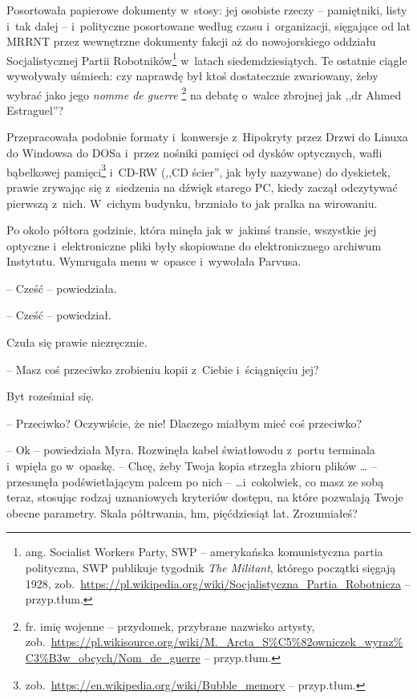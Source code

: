 \documentclass[oneside,polish,11pt,sfheadings]{mwbk}
\begin{document}
Posortowała papierowe dokumenty w~stosy: jej osobiste rzeczy -- pamiętniki, listy i~tak dalej -- i~polityczne posortowane według czasu i~organizacji, sięgające od lat MRRNT przez wewnętrzne dokumenty fakcji aż
do nowojorskiego oddziału Socjalistycznej Partii Robotników\footnote{ ang.
Socialist Workers Party, SWP -- amerykańska komunistyczna partia
polityczna, SWP publikuje tygodnik \textit{The Militant}, którego początki
sięgają 1928,
zob.~\url{https://pl.wikipedia.org/wiki/Socjalistyczna\_Partia\_Robotnicza}
-- przyp.tłum.} w~latach siedemdziesiątych. Te ostatnie ciągle
wywoływały uśmiech: czy naprawdę był ktoś dostatecznie zwariowany, żeby
wybrać jako jego \textit{nomme de guerre} \footnote{ fr. imię wojenne -- przydomek, przybrane nazwisko artysty,
zob.~\url{https://pl.wikisource.org/wiki/M.\_Arcta\_S\%C5\%82owniczek\_wyraz\%C3\%B3w\_obcych/Nom\_de\_guerre}
-- przyp.tłum.} na debatę o~walce zbrojnej jak ,,dr Ahmed Estraguel''?

Przepracowała podobnie formaty i~konwersje z~Hipokryty przez Drzwi do
Linuxa do Windowsa do DOSa i~przez nośniki pamięci od dysków optycznych,
wafli bąbelkowej pamięci\footnote{
zob.~\url{https://en.wikipedia.org/wiki/Bubble\_memory} -- przyp.tłum.} i~CD-RW (,,CD ścier'', jak były nazywane) do dyskietek,
prawie zrywając się z~siedzenia na dźwięk starego PC, kiedy zaczął
odczytywać pierwszą z~nich. W~cichym budynku, brzmiało to jak pralka na
wirowaniu.

Po około półtora godzinie, która minęła jak w~jakimś transie, wszystkie
jej optyczne i~elektroniczne pliki były skopiowane do elektronicznego
archiwum Instytutu. Wymrugała menu w~opasce i~wywołała Parvusa.

-- Cześć -- powiedziała.

-- Cześć -- powiedział.

Czuła się prawie niezręcznie. 

-- Masz coś przeciwko zrobieniu kopii z~Ciebie i~ściągnięciu jej?

Byt roześmiał się. 

-- Przeciwko? Oczywiście, że nie! Dlaczego miałbym
mieć coś przeciwko?

-- Ok -- powiedziała Myra. Rozwinęła kabel światłowodu z~portu terminala i~wpięła go w~opaskę. -- Chcę, żeby Twoja kopia strzegła zbioru plików \ldots
-- przesunęła podświetlającym palcem po nich -- \ldots i~cokolwiek, co masz
ze sobą teraz, stosując rodzaj uznaniowych kryteriów dostępu, na które
pozwalają Twoje obecne parametry. Skala półtrwania, hm, pięćdziesiąt
lat. Zrozumiałeś?
\end{document}
